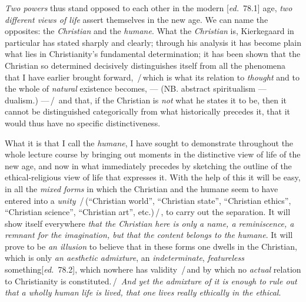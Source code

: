 \documentclass[12pt,a4paper,openany]{book}
\newcommand{\kpage}[1]{\marginnote{\footnotesize\textit{[#1]}}}
\newcommand{\ed}[1]{{\small[\textit{ed.}\ #1]}}
\newcommand{\ins}[1]{\,/\,#1\,/\,}
\begin{document}
\emph{Two powers} thus stand opposed to each other in the modern \ed{78.1} age,
\emph{two different views of life} assert themselves in the new age. We can
\kpage{187}name the opposites: the \emph{Christian} and the \emph{humane}. What the
\emph{Christian} is, Kierkegaard in particular has stated sharply and clearly; through
his analysis it has become plain what lies in Christianity's
fundamental determination; it has been shown that the Christian so determined
decisively distinguishes itself from all the phenomena that I have earlier
brought forward, \ins{which is what its relation to \emph{thought} and to
the whole of \emph{natural} existence becomes, --- (NB. abstract spiritualism --- dualism.)
---} and that, if the Christian is \emph{not} what he states it
to be, then it cannot be distinguished categorically from what historically
precedes it, that it would thus have no specific
distinctiveness.

What it is that I call the \emph{humane}, I have sought to demonstrate
throughout the whole lecture course by bringing out moments in the distinctive view of life
of the new age, and now in what immediately precedes
by sketching the outline of the ethical-religious view of life
that expresses it. With the help of this it will be easy, in all the
\emph{mixed forms} in which the Christian and the humane seem to have
entered into a \emph{unity} \ins{(``Christian world'', ``Christian state'', ``Christian
ethics'', ``Christian science'', ``Christian art'', etc.)}, to
carry out the separation. It will show itself everywhere \emph{that the Christian here is only
a name, a reminiscence, a remnant for the imagination, but that the content belongs to the
humane}. It will prove to be \emph{an illusion} to believe that in these forms one dwells in
the Christian, which is only \emph{an aesthetic admixture}, an \emph{indeterminate}, \emph{featureless} something\ed{78.2},
which nowhere has validity \ins{and by which no \emph{actual}
relation to Christianity is constituted.} \emph{And yet the admixture
of it is enough to rule out that a wholly human life is lived, that one lives
really ethically in the ethical}.
\end{document}
